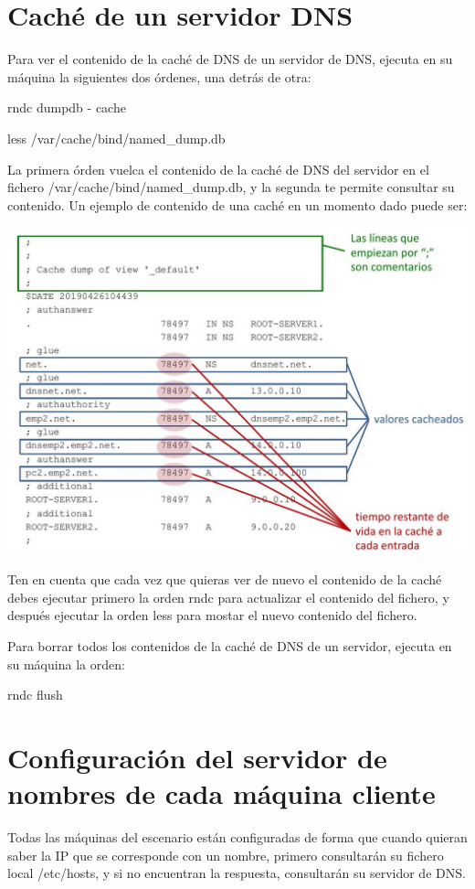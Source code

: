 \documentclass[12pt, a4paper]{report}
\begin{document}
\chapter{Caché de un servidor DNS}
Para ver el contenido de la caché de DNS de un servidor de DNS, ejecuta en su máquina la siguientes dos órdenes, una detrás de otra:

rndc dumpdb - cache

less /var/cache/bind/named\_dump.db

La primera órden vuelca el contenido de la caché de DNS del servidor en el fichero /var/cache/bind/named\_dump.db, y la segunda te permite consultar su contenido. Un ejemplo de contenido de una caché en un momento dado puede ser:

\begin{center}
\includegraphics[max width=\textwidth]{2022_12_15_5d692d3f6b88770a0becg-4(1)}
\end{center}

Ten en cuenta que cada vez que quieras ver de nuevo el contenido de la caché debes ejecutar primero la orden rndc para actualizar el contenido del fichero, y después ejecutar la orden less para mostar el nuevo contenido del fichero.

Para borrar todos los contenidos de la caché de DNS de un servidor, ejecuta en su máquina la orden:

rndc flush

\chapter{Configuración del servidor de nombres de cada máquina cliente}
Todas las máquinas del escenario están configuradas de forma que cuando quieran saber la IP que se corresponde con un nombre, primero consultarán su fichero local /etc/hosts, y si no encuentran la respuesta, consultarán su servidor de DNS.
\end{document}

